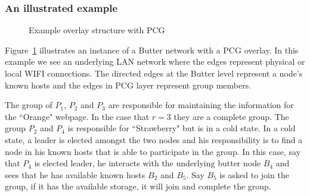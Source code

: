 

\subsubsection{An illustrated example}

\begin{figure}[ht]
    \centering
    
    \caption{Example overlay structure with PCG}
    \label{fig:overlayPCG}
\end{figure}

Figure~\ref{fig:overlayPCG} illustrates an instance of a Butter network with a PCG overlay. In this example we see an underlying LAN network where the edges represent physical or local WIFI connections. The directed edges at the Butter level represent a node's known hosts and the edges in PCG layer represent group members.

The group of $P_1$, $P_2$ and $P_3$ are responsible for maintaining the information for the ``Orange" webpage. In the case that $r=3$ they are a complete group. The group $P_2$ and $P_4$ is responsible for ``Strawberry" but is in a cold state. In a cold state, a leader is elected amongst the two nodes and his responsibility is to find a node in his known hosts that is able to participate in the group. In this case, say that $P_4$ is elected leader, he interacts with the underlying butter node $B_4$ and sees that he has available known hosts $B_2$ and $B_5$. Say $B_5$ is asked to join the group, if it has the available storage, it will join and complete the group.

